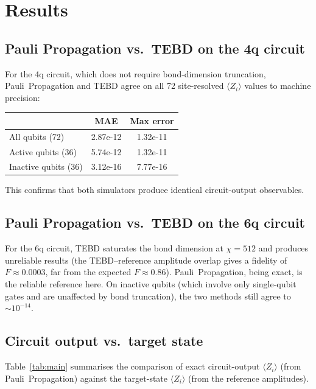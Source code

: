 \documentclass[11pt]{article}
\begin{document}
\section{Results}

\subsection{Pauli Propagation vs.\ TEBD on the 4q circuit}

For the 4q circuit, which does not require bond-dimension truncation, Pauli~Propagation and TEBD agree on all 72 site-resolved $\langle Z_i \rangle$ values to machine precision:
\begin{center}
\begin{tabular}{lS[table-format=1.2e-1]S[table-format=1.2e-1]}
\toprule
 & {MAE} & {Max error} \\
\midrule
All qubits (72)     & 2.87e-12 & 1.32e-11 \\
Active qubits (36)  & 5.74e-12 & 1.32e-11 \\
Inactive qubits (36)& 3.12e-16 & 7.77e-16 \\
\bottomrule
\end{tabular}
\end{center}
This confirms that both simulators produce identical circuit-output observables.

\subsection{Pauli Propagation vs.\ TEBD on the 6q circuit}

For the 6q circuit, TEBD saturates the bond dimension at $\chi=512$ and produces unreliable results (the TEBD--reference amplitude overlap gives a fidelity of $F\approx 0.0003$, far from the expected $F\approx 0.86$).
Pauli~Propagation, being exact, is the reliable reference here.
On inactive qubits (which involve only single-qubit gates and are unaffected by bond truncation), the two methods still agree to $\sim 10^{-14}$.

\subsection{Circuit output vs.\ target state}

Table~\ref{tab:main} summarises the comparison of exact circuit-output $\langle Z_i \rangle$ (from Pauli~Propagation) against the target-state $\langle Z_i \rangle$ (from the reference amplitudes).
\end{document}
